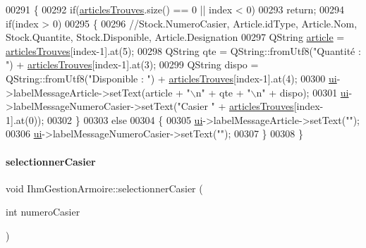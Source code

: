 \begin{DoxyCode}
00291 \{
00292     \textcolor{keywordflow}{if}(\hyperlink{class_ihm_gestion_armoire_a21821dc4f15d87125efb933991eb4385}{articlesTrouves}.size() == 0 || index < 0)
00293         \textcolor{keywordflow}{return};
00294     \textcolor{keywordflow}{if}(index > 0)
00295     \{
00296         \textcolor{comment}{//Stock.NumeroCasier, Article.idType, Article.Nom, Stock.Quantite, Stock.Disponible,
       Article.Designation}
00297         QString \hyperlink{class_ihm_gestion_armoire_a0a3af042f7a9d5a6bac634e2b053828d}{article} = \hyperlink{class_ihm_gestion_armoire_a21821dc4f15d87125efb933991eb4385}{articlesTrouves}[index-1].at(5);
00298         QString qte = QString::fromUtf8(\textcolor{stringliteral}{"Quantité : "}) + \hyperlink{class_ihm_gestion_armoire_a21821dc4f15d87125efb933991eb4385}{articlesTrouves}[index-1].at(3);
00299         QString dispo = QString::fromUtf8(\textcolor{stringliteral}{"Disponible : "}) + \hyperlink{class_ihm_gestion_armoire_a21821dc4f15d87125efb933991eb4385}{articlesTrouves}[index-1].at(4);
00300         \hyperlink{class_ihm_gestion_armoire_a793a2816dc21b3161566138d2af5a8b9}{ui}->labelMessageArticle->setText(article + \textcolor{stringliteral}{"\(\backslash\)n"} + qte + \textcolor{stringliteral}{"\(\backslash\)n"} + dispo);
00301         \hyperlink{class_ihm_gestion_armoire_a793a2816dc21b3161566138d2af5a8b9}{ui}->labelMessageNumeroCasier->setText(\textcolor{stringliteral}{"Casier "} + \hyperlink{class_ihm_gestion_armoire_a21821dc4f15d87125efb933991eb4385}{articlesTrouves}[index-1].at(0));
00302     \}
00303     \textcolor{keywordflow}{else}
00304     \{
00305         \hyperlink{class_ihm_gestion_armoire_a793a2816dc21b3161566138d2af5a8b9}{ui}->labelMessageArticle->setText(\textcolor{stringliteral}{""});
00306         \hyperlink{class_ihm_gestion_armoire_a793a2816dc21b3161566138d2af5a8b9}{ui}->labelMessageNumeroCasier->setText(\textcolor{stringliteral}{""});
00307     \}
00308 \}
\end{DoxyCode}
\mbox{\label{class_ihm_gestion_armoire_ac2e2365408fcbf66c0e75bb828b40162}} 
\paragraph{\texorpdfstring{selectionner\+Casier}{selectionnerCasier}}
{\footnotesize\ttfamily void Ihm\+Gestion\+Armoire\+::selectionner\+Casier (\begin{DoxyParamCaption}\item[{int}]{numero\+Casier }\end{DoxyParamCaption})\hspace{0.3cm}{\ttfamily [slot]}}


